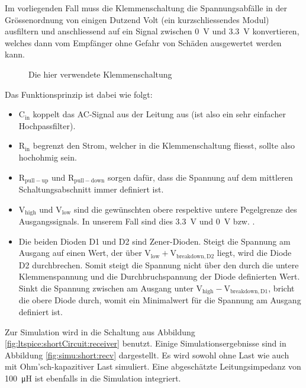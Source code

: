 Im vorliegenden Fall  muss die Klemmenschaltung die  Spannungsabf\"alle in der
Gr\"ossenordnung  von  einigen  Dutzend  Volt  (ein  kurzschliessendes  Modul)
ausfiltern  und  anschliessend  auf  ein  Signal  zwischen  \SI{0}{\volt}  und
\SI{3.3}{\volt}  konvertieren, welches  dann vom  Empf\"anger ohne  Gefahr von
Sch\"aden ausgewertet werden kann.

\begin{figure}[h!tb]
    \centering
    
    \caption[Klemmenschaltung]{Die hier verwendete Klemmenschaltung}
    \label{fig:circuit:clamper}
\end{figure}

Das Funktionsprinzip ist dabei wie folgt:

\begin{itemize}
    \tightlist
    \item
        $\mathrm{C_{in}}$ koppelt das AC-Signal aus  der Leitung aus (ist also
        ein sehr einfacher Hochpassfilter).
    \item
        $\mathrm{R_{in}}$ begrenzt den Strom,  welcher in die Klemmenschaltung
        fliesst, sollte also hochohmig sein.
    \item
        $\mathrm{R_{pull-up}}$  und  $\mathrm{R_{pull-down}}$ sorgen  daf\"ur,
        dass  die   Spannung  auf  dem  mittleren   Schaltungsabschnitt  immer
        definiert ist.
    \item
        $\mathrm{V_{high}}$  und  $\mathrm{V_{low}}$  sind  die  gew\"unschten
        obere  respektive untere  Pegelgrenze des  Ausgangssignals. In unserem
        Fall sind dies \SI{3.3}{\volt} und \SI{0}{\volt} bzw. .
    \item
        Die   beiden  Dioden   D1   und  D2   sind  Zener-Dioden. Steigt   die
        Spannung  am Ausgang  auf einen  Wert, der  \"uber $\mathrm{V_{low}  +
        V_{breakdown,D2}}$ liegt, wird die Diode D2 durchbrechen. Somit steigt
        die Spannung nicht \"uber den durch die untere Klemmenspannung und die
        Durchbruchspannung  der  Diode  definierten Wert. Sinkt  die  Spannung
        zwischen  am  Ausgang  unter $\mathrm{V_{high}  -  V_{breakdown,D1}}$,
        bricht die obere Diode durch, womit ein Minimalwert f\"ur die Spannung
        am Ausgang definiert ist.
\end{itemize}

Zur   Simulation  wird   in     die   Schaltung  aus   Abbildung
\ref{fig:ltspice:shortCircuit:receiver}  benutzt. Einige Simulationsergebnisse
sind in  Abbildung \ref{fig:simu:short:recv} dargestellt. Es wird  sowohl ohne
Last  wie auch  mit  Ohm'sch-kapazitiver  Last simuliert. Eine  abgesch\"atzte
Leitungsimpedanz von  \SI{100}{\micro\henry} ist  ebenfalls in  die Simulation
integriert.

